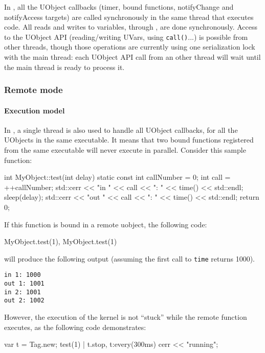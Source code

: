 In , all the UObject callbacks (timer, bound
functions, notifyChange and notifyAccess targets) are called
synchronously in the same thread that executes \us code. All reads and
writes to \urbi variables, through , are done
synchronously. Access to the UObject API (reading/writing UVars, using
\lstinline|call()|...) is possible from other threads, though those
operations are currently using one serialization lock with the main
thread: each UObject API call from an other thread will wait until the
main thread is ready to process it.


\subsubsection{Remote mode}

\paragraph{Execution model}

In , a single thread is also used to handle all
UObject callbacks, for all the UObjects in the same executable. It
means that two bound functions registered from the same executable
will never execute in parallel. Consider this sample \Cxx function:

\begin{cxx}
int MyObject::test(int delay)
{
  static const int callNumber = 0;
  int call = ++callNumber;
  std::cerr << "in "  << call << ": " << time() << std::endl;
  sleep(delay);
  std::cerr << "out " << call << ": " << time() << std::endl;
  return 0;
}
\end{cxx}

If this function is bound in a remote uobject, the following code:

\begin{cxx}
MyObject.test(1), MyObject.test(1)
\end{cxx}

\noindent
will produce the following output (assuming the first call to
\lstinline|time| returns 1000).

\begin{verbatim}
in 1: 1000
out 1: 1001
in 2: 1001
out 2: 1002
\end{verbatim}

However, the execution of the \urbi kernel is not ``stuck'' while the
remote function executes, as the following code demonstrates:

\begin{urbiunchecked}
var t = Tag.new;
test(1) | t.stop,
t:every(300ms)
  cerr << "running";
\end{urbiunchecked}

